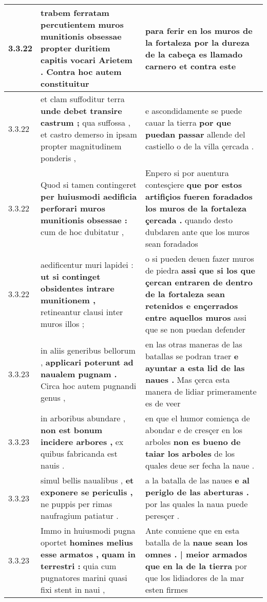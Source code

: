 \begin{tabular}{|p{1cm}|p{6.5cm}|p{6.5cm}|}
3.3.22 & trabem ferratam percutientem muros munitionis obsessae \textbf{ propter duritiem capitis vocari Arietem . } Contra hoc autem constituitur & para ferir en los muros de la fortaleza \textbf{ por la dureza de la cabeça es llamado carnero } et contra este \\\hline
3.3.22 & et clam suffoditur terra \textbf{ unde debet transire castrum ; } qua suffossa , et castro demerso in ipsam propter magnitudinem ponderis , & e ascondidamente se puede cauar la tierra \textbf{ por que puedan passar } allende del castiello o de la villa çercada . \\\hline
3.3.22 & Quod si tamen contingeret \textbf{ per huiusmodi aedificia perforari muros munitionis obsessae : } cum de hoc dubitatur , & Enpero si por auentura contesçiere \textbf{ que por estos artifiçios fueren foradados los muros de la fortaleza çercada . } quando desto dubdaren ante que los muros sean foradados \\\hline
3.3.22 & aedificentur muri lapidei : \textbf{ ut si continget obsidentes intrare munitionem , } retineantur clausi inter muros illos ; & o si pueden deuen fazer muros de piedra \textbf{ assi que si los que çercan entraren de dentro de la fortaleza sean retenidos e ençerrados entre aquellos muros } assi que se non puedan defender \\\hline
3.3.23 & in aliis generibus bellorum , \textbf{ applicari poterunt ad naualem pugnam . } Circa hoc autem pugnandi genus , & en las otras maneras de las batallas se podran traer \textbf{ e ayuntar a esta lid de las naues . } Mas çerca esta manera de lidiar primeramente es de veer \\\hline
3.3.23 & in arboribus abundare , \textbf{ non est bonum incidere arbores , } ex quibus fabricanda est nauis . & en que el humor comiença de abondar e de cresçer en los arboles \textbf{ non es bueno de taiar los arboles } de los quales deue ser fecha la naue . \\\hline
3.3.23 & simul bellis naualibus , \textbf{ et exponere se periculis , } ne puppis per rimas naufragium patiatur . & a la batalla de las naues \textbf{ e al periglo de las aberturas . } por las quales la naua puede peresçer . \\\hline
3.3.23 & Immo in huiusmodi pugna oportet \textbf{ homines melius esse armatos , quam in terrestri : } quia cum pugnatores marini quasi fixi stent in naui , & Ante conuiene que en esta batalla de la \textbf{ naue sean los omnes . | meior armados que en la de la tierra } por que los lidiadores de la mar esten firmes \\\hline

\end{tabular}
